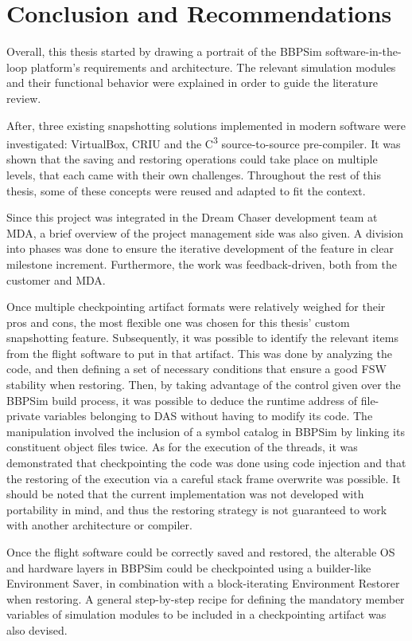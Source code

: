 \chapter{Conclusion and Recommendations}\label{cha:conclusion}
Overall, this thesis started by drawing a portrait of the \gls{BBPSim} software-in-the-loop platform's requirements and architecture. The relevant simulation modules and their functional behavior were explained in order to guide the literature review. 

After, three existing snapshotting solutions implemented in modern software were investigated: VirtualBox, \gls{CRIU} and the C\textsuperscript{3} source-to-source pre-compiler. It was shown that the saving and restoring operations could take place on multiple levels, that each came with their own challenges. Throughout the rest of this thesis, some of these concepts were reused and adapted to fit the context.

Since this project was integrated in the Dream Chaser development team at \gls{MDA}, a brief overview of the project management side was also given. A division into phases was done to ensure the iterative development of the feature in clear milestone increment. Furthermore, the work was feedback-driven, both from the customer and MDA.

Once multiple checkpointing artifact formats were relatively weighed for their pros and cons, the most flexible one was chosen for this thesis' custom snapshotting feature. Subsequently, it was possible to identify the relevant items from the flight software to put in that artifact. This was done by analyzing the code, and then defining a set of necessary conditions that ensure a good FSW stability when restoring. Then, by taking advantage of the control given over the BBPSim build process, it was possible to deduce the runtime address of file-private variables belonging to DAS without having to modify its code. The manipulation involved the inclusion of a symbol catalog in BBPSim by linking its constituent object files twice. As for the execution of the threads, it was demonstrated that checkpointing the code was done using code injection and that the restoring of the execution via a careful stack frame overwrite was possible. It should be noted that the current implementation was not developed with portability in mind, and thus the restoring strategy is not guaranteed to work with another architecture or compiler.

Once the flight software could be correctly saved and restored, the alterable OS and hardware layers in BBPSim could be checkpointed using a builder-like Environment Saver, in combination with a block-iterating Environment Restorer when restoring. A general step-by-step recipe for defining the mandatory member variables of simulation modules to be included in a checkpointing artifact was also devised. 

